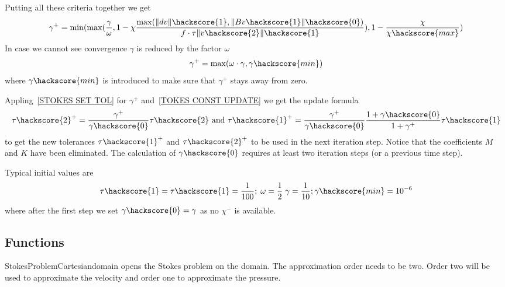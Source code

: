 Putting all these criteria together we get
\begin{equation}
\gamma^{+}=\min(\max(
\frac{\gamma}{\omega},
1 - 
\chi \frac{\max(\|dv\|\hackscore{1}, \|Bv\hackscore{1}\|\hackscore{0})} { f \cdot \tau \|v\hackscore{2}\|\hackscore{1}}), 1 - \frac{\chi}{\chi\hackscore{max}})
\label{STOKES SET GAMMA PLUS}
\end{equation}
In case we cannot see convergence $\gamma$ is reduced by the factor $\omega$
\begin{equation}
\gamma^{+}=\max(\omega \cdot \gamma, \gamma\hackscore{min})\label{STOKES SET GAMMA PLUS2}
\end{equation}
where $\gamma\hackscore{min}$ is introduced to make sure that $\gamma^{+}$ stays away from zero. 


Appling~\ref{STOKES SET TOL} for $\gamma^{+}$ and~\ref{TOKES CONST UPDATE} we get the update formula 
\begin{equation} \label{STOKES CONST UPDATE}
\tau\hackscore{2}^{+} = 
\frac{\gamma^{+}}{\gamma\hackscore{0}} \tau\hackscore{2}
\mbox{ and } \tau\hackscore{1}^{+} = 
\frac{\gamma^{+}}{\gamma\hackscore{0}}
\frac{1+\gamma\hackscore{0}}{1+\gamma^{+}}
\tau\hackscore{1}
\end{equation}
to get the new tolerances $\tau\hackscore{1}^{+}$ and $\tau\hackscore{2}^{+}$ to be used in the next iteration step.
Notice that the coefficients $M$ and $K$ have been eliminated. The calculation of $\gamma\hackscore{0}$ requires 
at least two iteration steps (or a previous time step). 

Typical initial values are
\begin{equation} \label{STOKES VALUES}
\tau\hackscore{1}=\tau\hackscore{1}=\frac{1}{100} ; \; \omega=\frac{1}{2} \; \gamma=\frac{1}{10} ;\gamma\hackscore{min}=10^{-6}
\end{equation}
where after the first step we set $\gamma\hackscore{0}=\gamma$ as no $\chi^{-}$ is available.


\subsection{Functions}

\begin{classdesc}{StokesProblemCartesian}{domain}
opens the Stokes problem on the \Domain domain. The approximation
order needs to be two. Order two will be used to approximate the velocity and order one 
to approximate the pressure.
\end{classdesc}

